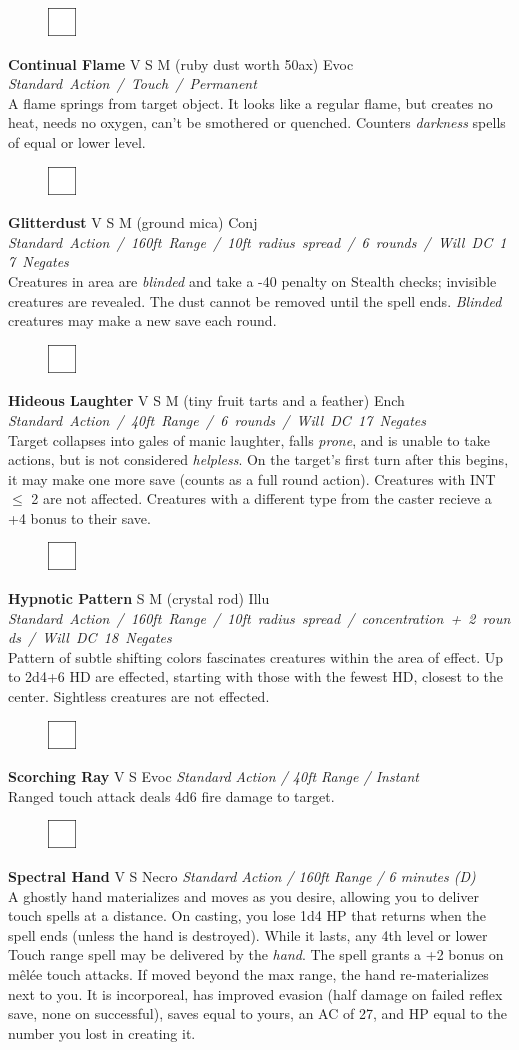 \documentclass[letterpaper]{article}
\newcommand{\spell}[7]{
\begin{figure}
\vspace{-13pt}
\ifstrequal{#2}{Full}{  \includegraphics[width=2em]{Checkbox-Full}}{
\ifstrequal{#2}{Scroll}{\includegraphics[width=2em]{Checkbox-S}}{
                        \includegraphics[width=2em]{Checkbox}}}
\ifstrequal{#7}{}{\vspace{-1em}}{\vspace{#7}}
\end{figure}
\noindent \textbf{#1} #3 {
    \ifstrequal{#4}{Conj}{\color{Plum}Conj}{%
    \ifstrequal{#4}{Divin}{\color{YellowOrange}Divin}{%
    \ifstrequal{#4}{Ench}{\color{VioletRed}Ench}{%
    \ifstrequal{#4}{Trans}{\color{LimeGreen}Trans}{%
    \ifstrequal{#4}{Evoc}{\color{RedOrange}Evoc}{%
    \ifstrequal{#4}{Illu}{\color{ProcessBlue}Illu}{%
    \ifstrequal{#4}{Abjur}{\color{CadetBlue}Abjur}{%
    \ifstrequal{#4}{Necro}{\color{Red}Necro}{%
}}}}}}}}}
{\footnotesize \emph{#5}} \\
#6
}
\begin{document}
\spell{Continual Flame}{}{V S M (ruby dust worth 50ax)}{Evoc}{\mbox{Standard Action / Touch / Permanent}}{%
A flame springs from target object.  It looks like a regular flame, but creates no heat, needs no oxygen, can't be smothered or quenched.  Counters \emph{darkness} spells of equal or lower level.}{}

\spell{Glitterdust}{}{V S M (ground mica)}{Conj}{\mbox{Standard Action / 160ft Range / 10ft radius spread / 6 rounds / Will DC 17 Negates }}{%
Creatures in area are \emph{blinded} and take a -40 penalty on Stealth checks; invisible creatures are revealed. The dust cannot be removed until the spell ends. \emph{Blinded} creatures may make a new save each round.}{} %

\spell{Hideous Laughter}{}{V S M (tiny fruit tarts and a feather)}{Ench}{\mbox{Standard Action / 40ft Range / 6 rounds / Will DC 17 Negates }}{%
Target collapses into gales of manic laughter, falls \emph{prone}, and is unable to take actions, but is not considered \emph{helpless}. On the target's first turn after this begins, it may make one more save (counts as a full round action).  Creatures with INT $\leq$ 2 are not affected.  Creatures with a different type from the caster recieve a +4 bonus to their save.}{0em} %

\spell{Hypnotic Pattern}{}{S M (crystal rod)}{Illu}{\mbox{Standard Action / 160ft Range / 10ft radius spread / concentration + 2 rounds / Will DC 18 Negates }}{%
Pattern of subtle shifting colors fascinates creatures within the area of effect.  Up to 2d4+6 HD are effected, starting with those with the fewest HD, closest to the center.  Sightless creatures are not effected.}{} %

\spell{Scorching Ray}{}{V S}{Evoc}{Standard Action / 40ft Range / Instant}{%
Ranged touch attack deals 4d6 fire damage to target.}{}\\[-1em] %

\spell{Spectral Hand}{}{V S}{Necro}{\emph{Standard Action / 160ft Range / 6 minutes (D)}}{%
A ghostly hand materializes and moves as you desire, allowing you to deliver touch spells at a distance.  On casting, you lose 1d4 HP that returns when the spell ends (unless the hand is destroyed).  While it lasts, any 4th level or lower Touch range spell may be delivered by the \emph{hand}.  The spell grants a +2 bonus on m\^{e}l\'{e}e touch attacks. If moved beyond the max range, the hand re-materializes next to you.  It is incorporeal, has improved evasion (half damage on failed reflex save, none on successful), saves equal to yours, an AC of 27, and HP equal to the number you lost in creating it.}{2em}\\[-2em] %
\end{document}
